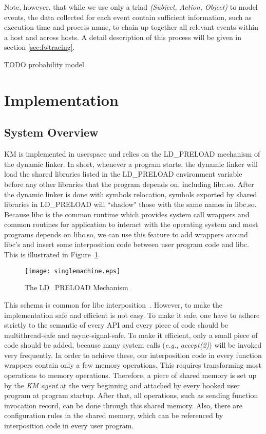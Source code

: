 \documentclass[letterpaper,twocolumn,10pt]{article}
\begin{document}
Note, however, that while we use only a triad \textit{(Subject, Action,
Object)} to model events, the data collected for each event contain sufficient
information, such as execution time and process name, to chain up together all
relevant events within a host and across hosts. A detail description of this
process will be given in section \ref{sec:fwtracing}.

TODO probability model

\section{Implementation}

\subsection{System Overview} KM is implemented in userspace and relies on the
LD\_PRELOAD mechanism of the dynamic linker. In short, whenever a program
starts, the dynamic linker will load the shared libraries listed in the
LD\_PRELOAD environment variable before any other libraries that the program
depends on, including libc.so. After the dynamic linker is done with symbols
relocation, symbols exported by shared libraries in LD\_PRELOAD will ``shadow"
those with the same names in libc.so. Because libc is the common runtime which
provides system call wrappers and common routines for application to interact
with the operating system and most programs depends on libc.so, we can use
this feature to add wrappers around libc's and insert some interposition code
between user program code and libc. This is illustrated in
Figure~\ref{fig:ldpreload}.

\begin{figure}[H]
    \centering
    \texttt{[image: singlemachine.eps]}
    \caption{The LD\_PRELOAD Mechanism}
    \label{fig:ldpreload}
\end{figure}

This schema is common for libc interposition~\cite{LDPRELOADLee:2011}. However, to
make the implementation safe and efficient is not easy. To make it safe, one
have to adhere strictly to the semantic of every API and every piece of code
should be multithread-safe and async-signal-safe. To make it efficient, only
a small piece of code should be added, because many system calls
(\textit{e.g.}, \textit{accept(2)}) will be invoked very frequently. In order
to achieve these, our interposition code in every function wrappers contain
only a few memory operations. This requires transforming most operations to
memory operations. Therefore, a piece of shared memory is set up by the
\textit{KM agent} at the very beginning and attached by every hooked user
program at program startup. After that, all operations, such as sending
function invocation record, can be done through this shared memory. Also,
there are configuration rules in the shared memory, which can be referenced
by interposition code in every user program.\\ 
\end{document}
